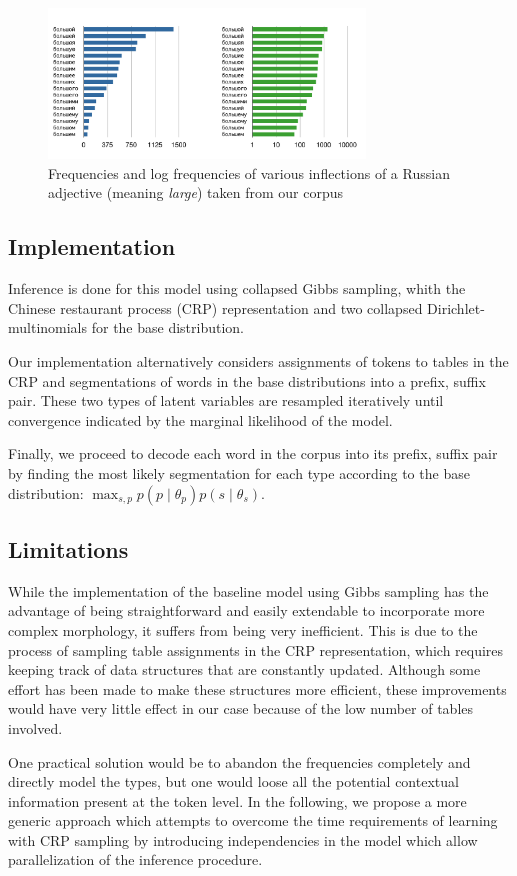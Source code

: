 \begin{figure}[h]
  \centering
  \includegraphics[width=0.75\textwidth]{fig/frequencies}
  \caption{Frequencies and log frequencies of various inflections of a Russian adjective (meaning \textit{large}) taken from our corpus}
  \label{fig:freq}
\end{figure}

\subsection{Implementation}
Inference is done for this model using collapsed Gibbs sampling, whith the Chinese restaurant process (CRP) representation and two collapsed Dirichlet-multinomials for the base distribution.

Our implementation alternatively considers assignments of tokens to tables in the CRP and segmentations of words in the base distributions into a prefix, suffix pair. These two types of latent variables are resampled iteratively until convergence indicated by the marginal likelihood of the model.

Finally, we proceed to decode each word in the corpus into its prefix, suffix pair by finding the most likely segmentation for each type according to the base distribution: $\max_{s,p} p(p \mid \theta_p) p(s \mid \theta_s)$.

\subsection{Limitations}

While the implementation of the baseline model using Gibbs sampling has the advantage of being straightforward and easily extendable to incorporate more complex morphology, it suffers from being very inefficient. This is due to the process of sampling table assignments in the CRP representation, which requires keeping track of data structures that are constantly updated. Although some effort has been made \cite{blunsom2009} to make these structures more efficient, these improvements would have very little effect in our case because of the low number of tables involved.

One practical solution would be to abandon the frequencies completely and directly model the types, but one would loose all the potential contextual information present at the token level. In the following, we propose a more generic approach which attempts to overcome the time requirements of learning with CRP sampling by introducing independencies in the model which allow parallelization of the inference procedure.

